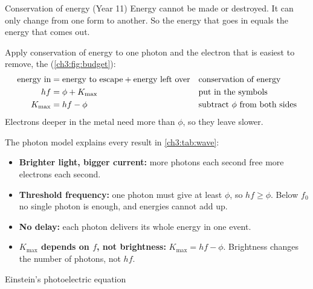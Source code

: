 \begin{refresher}{Conservation of energy (Year 11)}
Energy cannot be made or destroyed. It can only change from one form to another. So
the energy that goes in equals the energy that comes out.
\end{refresher}

Apply conservation of energy to one photon and the electron that is easiest to
remove, the  (\cref{ch3:fig:budget}):
\begin{align}
  \text{energy in} &= \text{energy to escape} + \text{energy left over}
     && \text{conservation of energy}\notag\\
  hf &= \phi + K_\mathrm{max} && \text{put in the symbols}\notag\\
  K_\mathrm{max} &= hf - \phi && \text{subtract $\phi$ from both sides}\label{ch3:eq:einstein}
\end{align}
Electrons deeper in the metal need more than $\phi$, so they leave slower.

The photon model explains every result in \cref{ch3:tab:wave}:
\begin{itemize}
  \item \textbf{Brighter light, bigger current:} more photons each second free more
        electrons each second.
  \item \textbf{Threshold frequency:} one photon must give at least $\phi$, so
        $hf \ge \phi$. Below $f_0$ no single photon is enough, and energies cannot add up.
  \item \textbf{No delay:} each photon delivers its whole energy in one event.
  \item \textbf{$K_\mathrm{max}$ depends on $f$, not brightness:}
        $K_\mathrm{max} = hf - \phi$. Brightness changes the number of photons, not $hf$.
\end{itemize}

\begin{formulacard}{Einstein's photoelectric equation}
  \begin{symbols}
  \end{symbols}
\end{formulacard}

